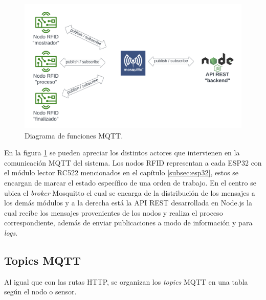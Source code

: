 \begin{figure}[ht]
	\centering
	\includegraphics[scale=.15]{./Figures/mqtt-funciones.png}
	\caption{Diagrama de funciones MQTT.}
	\label{fig:mqttfunciones}
	
\end{figure}

En la figura \ref{fig:mqttfunciones} se pueden apreciar los distintos actores que intervienen en la comunicación MQTT del sistema. Los nodos RFID representan a cada ESP32 con el módulo lector RC522 mencionados en el capítulo \ref{subsec:esp32}, estos se encargan de marcar el estado específico de una orden de trabajo. En el centro se ubica el \textit{broker} Mosquitto el cual se encarga de la distribución de los mensajes a los demás módulos y a la derecha está la API REST desarrollada en Node.js la cual recibe los mensajes provenientes de los nodos y realiza el proceso correspondiente, además de enviar publicaciones a modo de información y para \textit{logs}.

\subsection{Topics MQTT}
\label{subsec:mqtttopics}

Al igual que con las rutas HTTP, se organizan los \textit{topics} MQTT en una tabla según el nodo o sensor.

